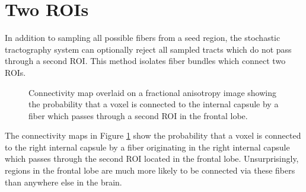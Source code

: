 \section{Two ROIs}

In addition to sampling all possible fibers from a seed region, the stochastic tractography system can optionally reject all sampled tracts which do not pass through a second ROI.  This method isolates fiber bundles which connect two ROIs.  
\begin{figure} \label{fig:twocmaps}
	\caption{Connectivity map overlaid on a fractional anisotropy image showing the probability that a voxel is connected to the internal capsule by a fiber which passes through a second ROI in the frontal lobe.}
\end{figure}

The connectivity maps in Figure \ref{fig:twocmaps} show the probability that a voxel is connected to the right internal capsule by a fiber originating in the right internal capsule which passes through the second ROI located in the frontal lobe.  Unsurprisingly, regions in the frontal lobe are much more likely to be connected via these fibers than anywhere else in the brain.

